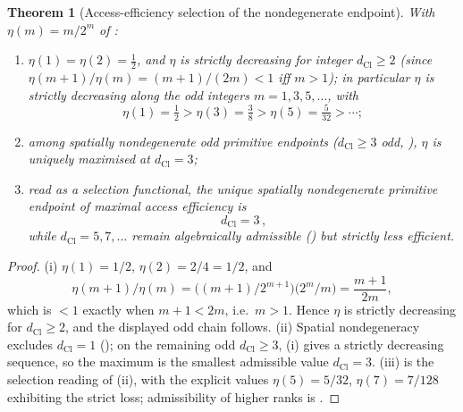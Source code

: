 \documentclass[11pt]{article}
\newtheorem{theorem}{Theorem}[section]
\theoremstyle{definition}
\theoremstyle{remark}
\newcommand{\dCl}{d_{\mathrm{Cl}}}
\begin{document}
\begin{theorem}[Access-efficiency selection of the nondegenerate endpoint]
\label{thm:access-efficiency-selection}
With \(\eta(m)=m/2^{m}\) of :
\begin{enumerate}[label=\textup{(\roman*)},leftmargin=2.4em]
\item \(\eta(1)=\eta(2)=\tfrac12\), and \(\eta\) is strictly decreasing
      for integer \(\dCl\ge2\) \textup{(}since
      \(\eta(m{+}1)/\eta(m)=(m{+}1)/(2m)<1\) iff \(m>1\)\textup{)}; in
      particular \(\eta\) is strictly decreasing along the odd integers
      \(m=1,3,5,\dots\), with
      \[
        \eta(1)=\tfrac12>\eta(3)=\tfrac38>\eta(5)=\tfrac5{32}>\cdots ;
      \]
\item among \emph{spatially nondegenerate} odd primitive endpoints
      \textup{(}\(\dCl\ge3\) odd, \textup{)},
      \(\eta\) is uniquely maximised at \(\dCl=3\);
\item read as a selection functional, the unique spatially
      nondegenerate primitive endpoint of maximal access efficiency is
      \[
        \boxed{\,\dCl=3\,},
      \]
      while \(\dCl=5,7,\dots\) remain algebraically admissible
      \textup{(}\textup{)} but
      strictly less efficient.
\end{enumerate}
\end{theorem}

\begin{proof}
(i) \(\eta(1)=1/2\), \(\eta(2)=2/4=1/2\), and
\[
  \eta(m{+}1)/\eta(m)
  =\bigl((m{+}1)/2^{m+1}\bigr)\bigl(2^{m}/m\bigr)
  =\frac{m+1}{2m},
\]
which is \(<1\) exactly when \(m+1<2m\), i.e.\ \(m>1\).  Hence \(\eta\) is
strictly decreasing for \(\dCl\ge2\), and the displayed odd chain follows.  (ii)
Spatial nondegeneracy excludes \(\dCl=1\) (); on
the remaining odd \(\dCl\ge3\), (i) gives a strictly decreasing sequence, so the
maximum is the smallest admissible value \(\dCl=3\).  (iii) is the selection reading
of (ii), with the explicit values \(\eta(5)=5/32\), \(\eta(7)=7/128\) exhibiting
the strict loss; admissibility of higher ranks is .
\end{proof}
\end{document}

